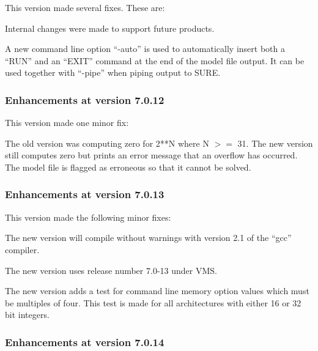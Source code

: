 This version made several fixes.   These are:
\begin{indenteditems}
\item Internal changes were made to support future products.
\item A new command line option ``-auto'' is used to automatically insert
      both a ``RUN'' and an ``EXIT'' command at the end of the model file
      output.   It can be used together with ``-pipe'' when piping output
      to SURE.
\end{indenteditems}

\subsubsection{Enhancements at version 7.0.12}

This version made one minor fix:
\begin{indenteditems}
\item The old version was computing zero for 2**N where N $>$$=$ 31.   The
      new version still computes zero but prints an error message
      that an overflow has occurred.   The model file is flagged as
      erroneous so that it cannot be solved.
\end{indenteditems}

\subsubsection{Enhancements at version 7.0.13}

This version made the following minor fixes:
\begin{indenteditems}
\item The new version will compile without warnings with
      version 2.1 of the ``gcc'' compiler.
\item The new version uses release number 7.0-13 under VMS.
\item The new version adds a test for command line memory option
      values which must be multiples of four.   This test is made
      for all architectures with either 16 or 32 bit integers.
\end{indenteditems}

\subsubsection{Enhancements at version 7.0.14}

